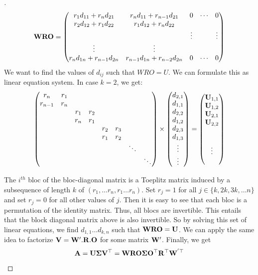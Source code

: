 \begin{proof}[]
\begin{equation}
  \mathbf{W}\mathbf{R}\mathbf{O} = \begin{pmatrix}
  r_{1}d_{11}+r_{n}d_{21} & r_{n}d_{11}+r_{n-1}d_{21} & 0 & \cdots & 0 \\
  r_{2}d_{12}+r_{1}d_{22} & r_{1}d_{12}+r_{n}d_{22}\\
   &  & \vdots &  & \vdots \\
  \vdots & \vdots\\
  r_{n}d_{1n}+r_{n-1}d_{2n} & r_{n-1}d_{1n}+r_{n-2}d_{2n} & 0 & \cdots & 0
  \end{pmatrix}
\end{equation}
We want to find the values of $d_{ij}$ such that $WRO=U$. We can formulate this as linear equation system. In case $k=2$, we get:
\begin{equation}
  \begin{pmatrix}
  r_{n} & r_{1}\\
  r_{n-1} & r_{n}\\
   &  & r_{1} & r_{2}\\
   &  & r_{n} & r_{1}\\
   &  &  &  & r_{2} & r_{3}\\
   &  &  &  & r_{1} & r_{2}\\
   &  &  &  &  &  & \ddots\\
   &  &  &  &  &  &  & \ddots
  \end{pmatrix} \times \begin{pmatrix}
  d_{2,1}\\
  d_{1,1}\\
  d_{2,2}\\
  d_{1,2}\\
  d_{2,3}\\
  d_{1,3}\\
  \vdots\\
  \vdots
  \end{pmatrix} = \begin{pmatrix}
  \mathbf{U}_{1,1}\\
  \mathbf{U}_{1,2}\\
  \mathbf{U}_{2,1}\\
  \mathbf{U}_{2,2}\\
  \\
  \\
  \vdots\\
  \\
  \end{pmatrix}
\end{equation}

The $i^{th}$ bloc of the bloc-diagonal matrix is a Toeplitz matrix induced by a subsequence of length $k$ of $(r_1,\ldots r_n,r_1 \ldots r_n)$.
Set $r_{j}=1$ for all $j\in\{k,2k,3k,\ldots n\}$ and set $r_{j}=0$ for all other values of $j$.
Then it is easy to see that each bloc is a permutation of the identity matrix.
Thus, all blocs are invertible.
This entails that the block diagonal matrix above is also invertible.
So by solving this set of linear equations, we find $d_{1,1}\ldots d_{k,n}$ such that $\mathbf{W}\mathbf{R}\mathbf{O}=\mathbf{U}$.
We can apply the same idea to factorize $\mathbf{V}=\mathbf{W}'.\mathbf{R}.\mathbf{O}$ for some matrix $\mathbf{W}'$.
Finally, we get 
\begin{equation}
  \mathbf{A} = \mathbf{U} \mathbf{\Sigma} \mathbf{V}^\top = \mathbf{W}\mathbf{R}\mathbf{O} \mathbf{\Sigma} \mathbf{O}^\top \mathbf{R}^\top \mathbf{W}^{'\top}
\end{equation}


\end{proof}
